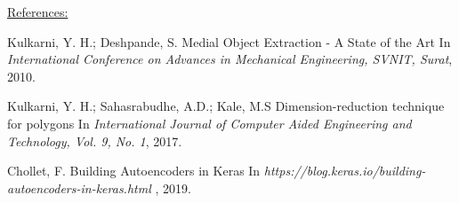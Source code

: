 \documentclass{article}
\makeatletter
\def\ULurl@#1{\hyper@linkurl{\ULurl@@{#1}}{#1}}
\DeclareRobustCommand*\ULurl{\hyper@normalise\ULurl@}
\makeatother
\begin{document}
\vspace{1em}
\noindent\underline{References:}\vspace{-1.9em}\newline
\renewcommand{\section}[2]{}
\begin{thebibliography}{9}

Kulkarni, Y. H.; Deshpande, S.
\newblock Medial Object Extraction - A State of the Art
\newblock In {\em International Conference on Advances in Mechanical Engineering, SVNIT, Surat}, 2010.

Kulkarni, Y. H.; Sahasrabudhe, A.D.; Kale, M.S
\newblock Dimension-reduction technique for polygons
\newblock In {\em International Journal of Computer Aided Engineering and Technology, Vol. 9, No. 1}, 2017.

Chollet, F.
\newblock Building Autoencoders in Keras
\newblock In {\em https://blog.keras.io/building-autoencoders-in-keras.html }, 2019.





\end{thebibliography}
\end{document}
